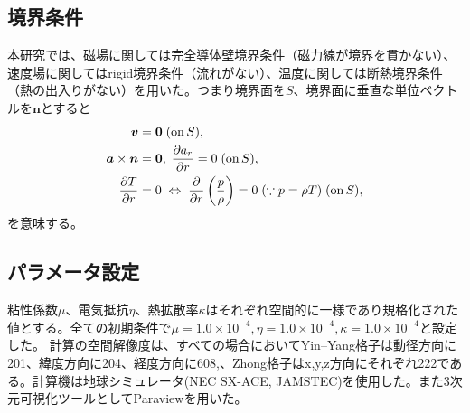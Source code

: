 \documentclass[12pt]{jsarticle}
\begin{document}


\subsection{境界条件}
本研究では、磁場に関しては完全導体壁境界条件（磁力線が境界を貫かない）、速度場に関してはrigid境界条件（流れがない）、温度に関しては断熱境界条件（熱の出入りがない）を用いた。つまり境界面を$S$、境界面に垂直な単位ベクトルを$\bm n$とすると
\begin{align}
\bm{v} &= \bm{0} \; ({\rm on}\, S), \\
\bm{a} \times \bm{n} &= \bm{0} , \; \frac{\partial a_r}{\partial r} = 0 \; ({\rm on}\, S), \\
\frac{\partial T}{\partial r} &= 0 \; \Leftrightarrow \; \frac{\partial}{\partial r}\left(\frac{p}{\rho}\right) = 0 \; (\because p=\rho T) \; ({\rm on}\, S),  
\end{align}
を意味する。

\subsection{パラメータ設定}
粘性係数$\mu$、電気抵抗$\eta$、熱拡散率$\kappa$はそれぞれ空間的に一様であり規格化された値とする。全ての初期条件で$\mu=1.0\times10^{-4},\eta=1.0\times10^{-4},\kappa=1.0\times10^{-4}$と設定した。
計算の空間解像度は、すべての場合においてYin--Yang格子は動径方向に201、緯度方向に204、経度方向に608,、Zhong格子はx,y,z方向にそれぞれ222である。計算機は地球シミュレータ(NEC SX-ACE, JAMSTEC)を使用した。また3次元可視化ツールとしてParaviewを用いた。
\end{document}
